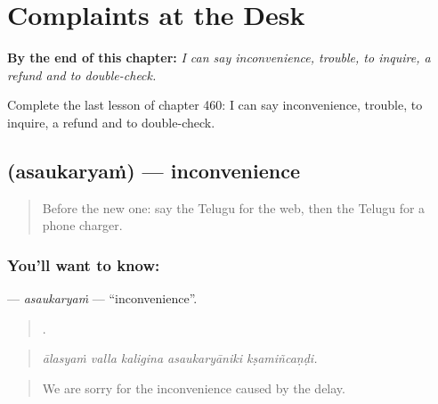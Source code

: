 
\chapter{Complaints at the Desk}
\label{ch:te-complaints-at-the-desk}

\begin{chapteropening}
\textbf{By the end of this chapter:} \emph{I can say inconvenience, trouble, to inquire, a refund and to double-check.}

Complete the last lesson of chapter 460: I can say inconvenience, trouble, to inquire, a refund and to double-check.
\end{chapteropening}

\section[\texorpdfstring{\te{అసౌకర్యం} (asaukaryaṁ)}{అసౌకర్యం (asaukaryaṁ)}]{ (asaukaryaṁ) — inconvenience}

\label{lesson:TE-C460-asaukaryam}



\begin{quote}
Before the new one: say the Telugu for the web, then the Telugu for a phone charger.
\end{quote}

\subsection*{You'll want to know: }
\textbf{} — \emph{asaukaryaṁ} — \textquotedblleft{}inconvenience\textquotedblright{}.

\begin{quote}
    .
\end{quote}

\begin{quote}
\emph{ālasyaṁ valla kaligina asaukaryāniki kṣamiñcaṇḍi.}
\end{quote}

\begin{quote}
We are sorry for the inconvenience caused by the delay.
\end{quote}

